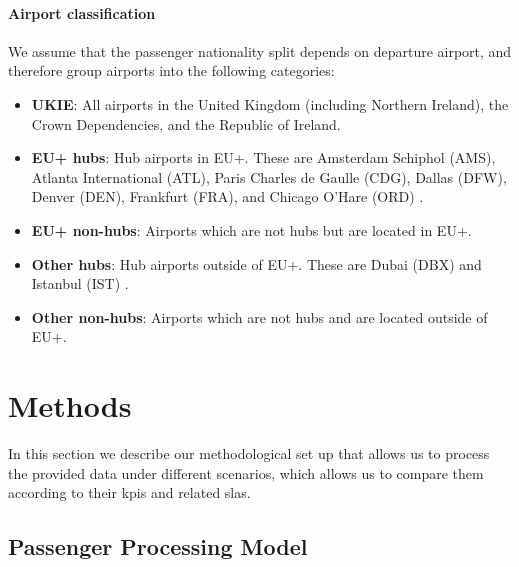 \documentclass[10pt]{article}
\begin{document}
\paragraph{Airport classification}
We assume that the passenger nationality split depends on departure airport, and therefore group airports into the following categories: 
\begin{itemize}
    \item \textbf{UKIE}: All airports in the United Kingdom (including Northern Ireland), the Crown Dependencies, and the Republic of Ireland.
    \item \textbf{EU+ hubs}: Hub airports in EU+. These are Amsterdam Schiphol (AMS), Atlanta International (ATL), Paris Charles de Gaulle (CDG), Dallas (DFW), Denver (DEN), Frankfurt (FRA), and Chicago O'Hare (ORD) \cite{mega_hubs}.
    \item \textbf{EU+ non-hubs}: Airports which are not hubs but are located in EU+.
    \item \textbf{Other hubs}: Hub airports outside of EU+. These are Dubai (DBX) and Istanbul (IST) \cite{mega_hubs}.
    \item \textbf{Other non-hubs}: Airports which are not hubs and are located outside of EU+.
\end{itemize}


\section{Methods} \label{sec:methods}

In this section we describe our methodological set up that allows us to process the provided data under different scenarios, which allows us to compare them according to their \glspl{kpi} and related \glspl{sla}.

\subsection{Passenger Processing Model}
\end{document}
